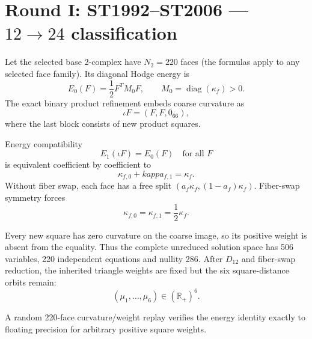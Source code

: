 \documentclass[11pt,a4paper]{article}
\begin{document}
\begin{abstract}
A coherent conditional repair is available: given complete factor Hodge
inner products and a cellular product, the tensor-product inner product gives
cross-square weight proportional to $wq$ and is associative and positive.
It still inherits the unsolved base complex/measure, factor normalization,
$q$, differential-calculus quotient and overall action scale.  It is not a
bootstrap from $A$ alone.

The central no-go is therefore precise: energy preservation, positivity,
automorphism naturality, homogeneity, associativity and Schur consistency do
not select a unique Hodge measure.  The highest-value next theorem is to
classify all $D_{12}$-equivariant second differentials
$d_1:C^1\to C^2$ satisfying $d_1d_0=0$ and the $12\to24\to48$ refinement
intertwining relations.  A one-dimensional solution space after normalization
would be a major breakthrough; higher dimension would be a decisive strict
gauge-geometry no-go.
\end{abstract}

\tableofcontents\newpage

\section{Round I: ST1992--ST2006 --- $12\to24$ classification}

Let the selected base 2-complex have $N_2=220$ faces (the formulas apply to any
selected face family).  Its diagonal Hodge energy is
\[
E_0(F)=\frac12F^TM_0F,\qquad
M_0=\operatorname{diag}(\kappa_f)>0.
\]
The exact binary product refinement embeds coarse curvature as
\[
\iota F=(F,F,0_{66}),
\]
where the last block consists of new product squares.

Energy compatibility
\[
E_1(\iota F)=E_0(F)\quad\text{for all }F
\]
is equivalent coefficient by coefficient to
\[
\kappa_{f,0}+kappa_{f,1}=\kappa_f.
\]
Without fiber swap, each face has a free split
$(a_f\kappa_f,(1-a_f)\kappa_f)$.  Fiber-swap symmetry forces
\[
\kappa_{f,0}=\kappa_{f,1}=\frac12\kappa_f.
\]

Every new square has zero curvature on the coarse image, so its positive
weight is absent from the equality.  Thus the complete unreduced solution
space has 506 variables, 220 independent equations and nullity 286.  After
$D_{12}$ and fiber-swap reduction, the inherited triangle weights are fixed
but the six square-distance orbits remain:
\[
(\mu_1,\ldots,\mu_6)\in(\mathbb R_+)^6.
\]

A random 220-face curvature/weight replay verifies the energy identity exactly
to floating precision for arbitrary positive square weights.
\end{document}
